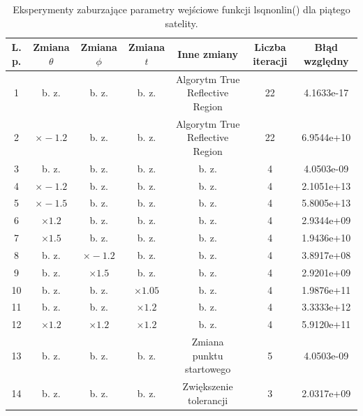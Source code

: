 \documentclass[]{article}
\begin{document}
\begin{table}[H]
	\begin{tabular}{||c c c c c | c c||}
		\hline
		L. p. & Zmiana $\theta$ & Zmiana $\phi$ & Zmiana $t$ & Inne zmiany & Liczba iteracji & Błąd względny \\ [0.5ex]
		\hline\hline
		1 & b. z. & b. z. & b. z. & Algorytm True Reflective Region & 22 & 4.1633e-17 \\
		\hline
		2 & $\times-1.2$ & b. z. & b. z. & Algorytm True Reflective Region & 22 & 6.9544e+10 \\
		\hline
		3 & b. z. & b. z. & b. z. & b. z. & 4 & 4.0503e-09 \\
		\hline
		4 & $\times-1.2$ & b. z. & b. z. & b. z. & 4 & 2.1051e+13 \\
		\hline
		5 & $\times-1.5$ & b. z. & b. z. & b. z. & 4 & 5.8005e+13 \\
		\hline
		6 & $\times1.2$ & b. z. & b. z. & b. z. & 4 & 2.9344e+09 \\
		\hline
		7 & $\times1.5$ & b. z. & b. z. & b. z. & 4 & 1.9436e+10 \\
		\hline
		8 & b. z. & $\times-1.2$ & b. z. & b. z. & 4 & 3.8917e+08 \\
		\hline
		9 & b. z. & $\times1.5$ & b. z. & b. z. & 4 & 2.9201e+09 \\
		\hline
		10 & b. z. & b. z. & $\times1.05$ & b. z. & 4 & 1.9876e+11 \\
		\hline
		11 & b. z. & b. z. & $\times1.2$ & b. z. & 4 & 3.3333e+12 \\
		\hline
		12 & $\times1.2$ & $\times1.2$ & $\times1.2$ & b. z. & 4 & 5.9120e+11 \\
		\hline
		13 & b. z. & b. z. & b. z. & Zmiana punktu startowego & 5 & 4.0503e-09 \\
		\hline
		14 & b. z. & b. z. & b. z. & Zwiększenie tolerancji & 3 & 2.0317e+09 \\
		\hline
	\end{tabular}
	\caption{Eksperymenty zaburzające parametry wejściowe funkcji lsqnonlin() dla piątego satelity.}
	\label{tab1}
	\end{table}
\end{document}

